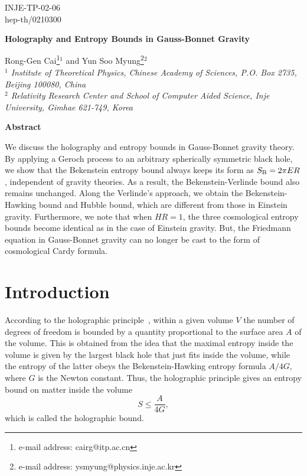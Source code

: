 \documentclass[a4paper,12pt]{article}
\newcommand{\sect}[1]{\setcounter{equation}{0}\section{#1}}
\begin{document}
\topmargin 0pt \oddsidemargin 0mm

\renewcommand{\thefootnote}{\fnsymbol{footnote}}
\begin{titlepage}
\begin{flushright}
INJE-TP-02-06\\
hep-th/0210300
\end{flushright}

\vspace{5mm}
\begin{center}
{\Large \bf Holography and Entropy Bounds in Gauss-Bonnet Gravity}
 \vspace{12mm}

{\large Rong-Gen Cai\footnote{e-mail address: cairg@itp.ac.cn}$^1$
 and Yun Soo Myung\footnote{e-mail
 address: ysmyung@physics.inje.ac.kr}$^2$}
 \\
\vspace{10mm} {\em $^1$ Institute of Theoretical Physics, Chinese
Academy of Sciences, P.O. Box 2735, Beijing 100080, China \\
$^2$ Relativity Research Center and School of Computer Aided
Science, Inje University, Gimhae 621-749, Korea}
\end{center}

\vspace{20mm}
 \centerline{{\bf{Abstract}}}
 \vspace{5mm}
We discuss the holography and entropy bounds in Gauss-Bonnet gravity theory.
By applying a Geroch process to an arbitrary spherically symmetric black
hole, we show that the Bekenstein entropy bound always keeps its form  as
$S_{\rm B}=2\pi E R$, independent of gravity theories. As a result,
the Bekenstein-Verlinde bound also remains unchanged.  Along the Verlinde's
approach, we obtain  the Bekenstein-Hawking bound and Hubble bound, which
are different from those in Einstein gravity. Furthermore, we note that when
$HR=1$,  the three cosmological entropy bounds become identical as in the case of
Einstein gravity. But, the Friedmann equation in Gauss-Bonnet gravity
can no longer be cast to  the form of cosmological Cardy formula.

\end{titlepage}

\newpage
\renewcommand{\thefootnote}{\arabic{footnote}}
\setcounter{footnote}{0} \setcounter{page}{2}

\sect{Introduction}

According to the holographic principle~\cite{HP}, within a given volume $V$ the number
of degrees of freedom is bounded by a quantity proportional to the  surface area $A$
of the volume. This is obtained from the idea that the maximal entropy inside the
volume is given by the largest black hole that just fits inside the volume, while the
entropy of the latter obeys the Bekenstein-Hawking entropy formula $A/4G$, where $G$ is
the Newton constant. Thus, the holographic principle gives an entropy bound on matter
inside  the volume
\begin{equation}
\label{1eq1}
S \le \frac{A}{4G},
\end{equation}
which is called the holographic bound.
\end{document}
